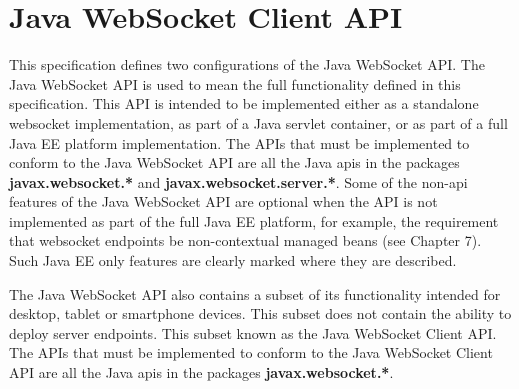 \section{Java WebSocket Client API}
\label{clientapi}

This specification defines two configurations of the Java WebSocket API. The Java WebSocket API is used to mean the full functionality defined in this specification. This API is intended to be implemented either as a standalone websocket implementation, as part of a Java servlet container, or as part of a full Java EE platform implementation. The APIs that must be implemented to conform to the Java WebSocket API are all the Java apis in the packages \textbf{javax.websocket.*} and \textbf{javax.websocket.server.*}. Some of the non-api features of the Java WebSocket API are optional when the API is not implemented as part of the full Java EE platform, for example, the requirement that websocket endpoints be non-contextual managed beans (see Chapter 7). Such Java EE only features are clearly marked where they are described.

The Java WebSocket API also contains a subset of its functionality intended for desktop, tablet or smartphone devices. This subset does not contain the ability to deploy server endpoints. This subset known as the Java WebSocket Client API. The APIs that must be implemented to conform to the Java WebSocket Client API are all the Java apis in the packages \textbf{javax.websocket.*}.
